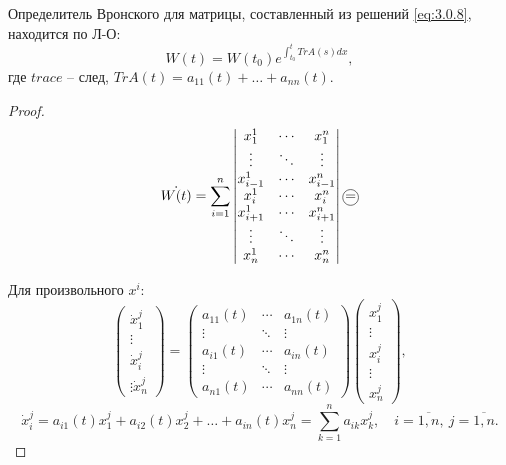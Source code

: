 \begin{theorem}
    Определитель Вронского для матрицы, составленный из решений \ref{eq:3.0.8}, находится по Л-О:
    \[
        W(t) = W(t_0)e^{\int_{t_0}^{t}Tr A(s)dx},
    \]
    где $ trace $ -- след, $ Tr A(t) = a_{11}(t) + \ldots + a_{nn}(t) $.
\end{theorem}

\begin{proof}
    \[
        \dot{W(t)} = \sum_{i=1}^{n}\left|\begin{matrix}
            x_1^1     & \cdots & x_1^n     \\
            \vdots    & \ddots & \vdots    \\
            x_{i-1}^1 & \cdots & x_{i-1}^n \\
            x_i^1     & \cdots & x_i^n     \\
            x_{i+1}^1 & \cdots & x_{i+1}^n \\
            \vdots    & \ddots & \vdots    \\
            x_n^1     & \cdots & x_n^n
        \end{matrix}\right| \circled{=}
    \]

    Для произвольного $ x^i $:
    \[
        \left(\begin{matrix}
                \dot{x}_1^j \\ \vdots \\ \dot{x}_i^j \\ \vdots \dot{x}_n^j
            \end{matrix}\right) = \left(\begin{matrix}
                a_{11}(t) & \cdots & a_{1n}(t) \\
                \vdots    & \ddots & \vdots    \\
                a_{i1}(t) & \cdots & a_{in}(t) \\
                \vdots    & \ddots & \vdots    \\
                a_{n1}(t) & \cdots & a_{nn}(t)
            \end{matrix}\right)\left(\begin{matrix}
                x_1^j \\ \vdots \\ x_i^j \\ \vdots \\ x_n^j
            \end{matrix}\right),
    \]
    \[
        \dot{x}_i^j = a_{i1}(t)x_1^j + a_{i2}(t)x_2^j + \ldots + a_{in}(t)x_n^j = \sum_{k=1}^{n}a_{ik}x_k^j, \quad i = \overline{1,n}, \ j = \overline{1,n}.
    \]


\end{proof}
